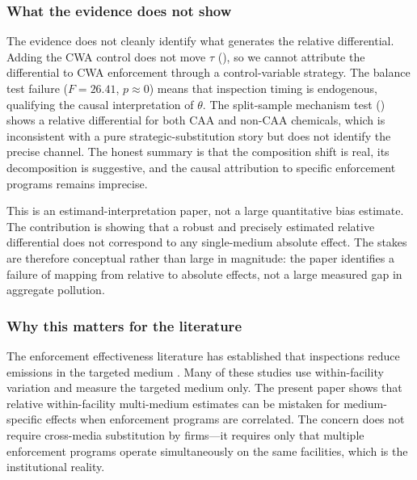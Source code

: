 \documentclass[12pt]{article}
\begin{document}
\subsubsection*{What the evidence does not show} The evidence does not cleanly identify what generates the relative differential. Adding the CWA control does not move $\hat{\tau}$ (), so we cannot attribute the differential to CWA enforcement through a control-variable strategy. The balance test failure ($F = 26.41$, $p \approx 0$) means that inspection timing is endogenous, qualifying the causal interpretation of $\theta$. The split-sample mechanism test () shows a relative differential for both CAA and non-CAA chemicals, which is inconsistent with a pure strategic-substitution story but does not identify the precise channel. The honest summary is that the composition shift is real, its decomposition is suggestive, and the causal attribution to specific enforcement programs remains imprecise.

This is an estimand-interpretation paper, not a large quantitative bias estimate. The contribution is showing that a robust and precisely estimated relative differential does not correspond to any single-medium absolute effect. The stakes are therefore conceptual rather than large in magnitude: the paper identifies a failure of mapping from relative to absolute effects, not a large measured gap in aggregate pollution.

\subsubsection*{Why this matters for the literature} The enforcement effectiveness literature has established that inspections reduce emissions in the targeted medium \citep{gray2005compliance, shimshack2007enforce, gray2011effectiveness}. Many of these studies use within-facility variation and measure the targeted medium only. The present paper shows that relative within-facility multi-medium estimates can be mistaken for medium-specific effects when enforcement programs are correlated. The concern does not require cross-media substitution by firms---it requires only that multiple enforcement programs operate simultaneously on the same facilities, which is the institutional reality.
\end{document}
